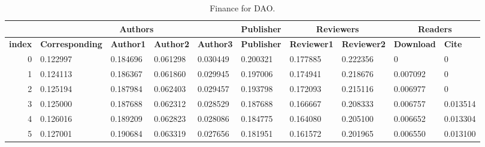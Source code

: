 \documentclass[lettersize,journal]{IEEEtran}
\begin{document}
\begin{table}[ht!]
  \begin{center}
    \caption{Finance for DAO.}
    \label{tab:finance}
    \begin{tabular}{r|l|l|l|l|l|l|l|l|l} %
                     & \multicolumn{4}{c|}{\textbf{Authors}} & \textbf{Publisher} & \multicolumn{2}{c|}{\textbf{Reviewers}} & \multicolumn{2}{c}{\textbf{Readers}}                                                                                                    \\
      \hline
      \textbf{index} & \textbf{Corresponding}                & \textbf{Author1}   & \textbf{Author2}                        & \textbf{Author3}                     & \textbf{Publisher} & \textbf{Reviewer1} & \textbf{Reviewer2} & \textbf{Download} & \textbf{Cite} \\
      \hline
      0              & 0.122997                              & 0.184696           & 0.061298                                & 0.030449                             & 0.200321           & 0.177885           & 0.222356           & 0                 & 0             \\
      1              & 0.124113                              & 0.186367           & 0.061860                                & 0.029945                             & 0.197006           & 0.174941           & 0.218676           & 0.007092          & 0             \\
      2              & 0.125194                              & 0.187984           & 0.062403                                & 0.029457                             & 0.193798           & 0.172093           & 0.215116           & 0.006977          & 0             \\
      3              & 0.125000                              & 0.187688           & 0.062312                                & 0.028529                             & 0.187688           & 0.166667           & 0.208333           & 0.006757          & 0.013514      \\
      4              & 0.126016                              & 0.189209           & 0.062823                                & 0.028086                             & 0.184775           & 0.164080           & 0.205100           & 0.006652          & 0.013304      \\
      5              & 0.127001                              & 0.190684           & 0.063319                                & 0.027656                             & 0.181951           & 0.161572           & 0.201965           & 0.006550          & 0.013100      \\

\end{tabular}
\end{center}
\end{table}
\end{document}
